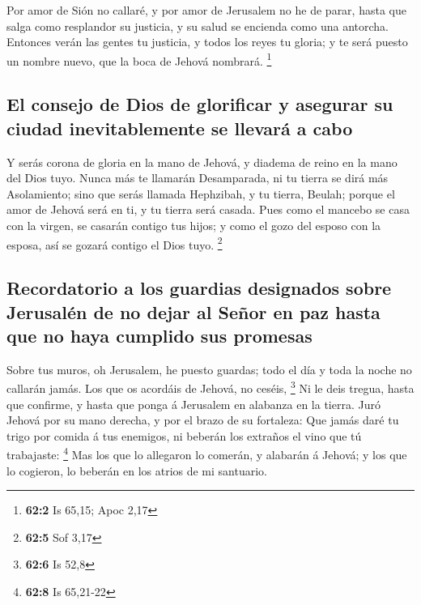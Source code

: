  Por amor de Sión no callaré, y por amor de Jerusalem no he
de parar, hasta que salga como resplandor su justicia, y su salud se
encienda como una antorcha.  Entonces verán las gentes tu
justicia, y todos los reyes tu gloria; y te será puesto un nombre nuevo,
que la boca de Jehová nombrará. \footnote{\textbf{62:2} Is 65,15; Apoc
  2,17}

\hypertarget{el-consejo-de-dios-de-glorificar-y-asegurar-su-ciudad-inevitablemente-se-llevaruxe1-a-cabo}{%
\subsection{El consejo de Dios de glorificar y asegurar su ciudad
inevitablemente se llevará a
cabo}\label{el-consejo-de-dios-de-glorificar-y-asegurar-su-ciudad-inevitablemente-se-llevaruxe1-a-cabo}}

 Y serás corona de gloria en la mano de Jehová, y diadema de
reino en la mano del Dios tuyo.  Nunca más te llamarán
Desamparada, ni tu tierra se dirá más Asolamiento; sino que serás
llamada Hephzibah, y tu tierra, Beulah; porque el amor de Jehová será en
ti, y tu tierra será casada.  Pues como el mancebo se casa
con la virgen, se casarán contigo tus hijos; y como el gozo del esposo
con la esposa, así se gozará contigo el Dios tuyo. \footnote{\textbf{62:5}
  Sof 3,17}

\hypertarget{recordatorio-a-los-guardias-designados-sobre-jerusaluxe9n-de-no-dejar-al-seuxf1or-en-paz-hasta-que-no-haya-cumplido-sus-promesas}{%
\subsection{Recordatorio a los guardias designados sobre Jerusalén de no
dejar al Señor en paz hasta que no haya cumplido sus
promesas}\label{recordatorio-a-los-guardias-designados-sobre-jerusaluxe9n-de-no-dejar-al-seuxf1or-en-paz-hasta-que-no-haya-cumplido-sus-promesas}}

 Sobre tus muros, oh Jerusalem, he puesto guardas; todo el
día y toda la noche no callarán jamás. Los que os acordáis de Jehová, no
ceséis, \footnote{\textbf{62:6} Is 52,8}  Ni le deis tregua,
hasta que confirme, y hasta que ponga á Jerusalem en alabanza en la
tierra.  Juró Jehová por su mano derecha, y por el brazo de
su fortaleza: Que jamás daré tu trigo por comida á tus enemigos, ni
beberán los extraños el vino que tú trabajaste: \footnote{\textbf{62:8}
  Is 65,21-22}  Mas los que lo allegaron lo comerán, y
alabarán á Jehová; y los que lo cogieron, lo beberán en los atrios de mi
santuario.

